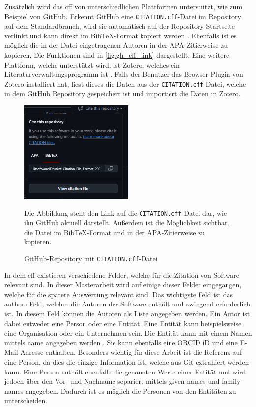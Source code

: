 Zusätzlich wird das \gls{cff} von unterschiedlichen Plattformen unterstützt, wie zum Beispiel von GitHub.
Erkennt GitHub eine \texttt{CITATION.cff}-Datei im Repository auf dem Standardbranch, wird sie automatisch auf der Repository-Startseite verlinkt und kann direkt im Bib\TeX{}-Format kopiert werden \autocite{druskat_citation_2021}.
Ebenfalls ist es möglich die in der Datei eingetragenen Autoren in der APA-Zitierweise zu kopieren.
Die Funktionen sind in \autoref{fig:gh_cff_link} dargestellt.
Eine weitere Plattform, welche unterstützt wird, ist Zotero, welches ein Literaturverwaltungsprogramm ist \autocite{druskat_citation_2021}.
Falls der Benutzer das Browser-Plugin von Zotero installiert hat, liest dieses die Daten aus der \texttt{CITATION.cff}-Datei, welche in dem GitHub Repository gespeichert ist und importiert die Daten in Zotero.

\begin{figure}
    \centering
    \includegraphics[width=0.5\textwidth]{bilder/GH_CFF_link.png}
    \caption{GitHub-Repository mit \texttt{CITATION.cff}-Datei}
    \label{fig:gh_cff_link}
    \small
    Die Abbildung stellt den Link auf die \texttt{CITATION.cff}-Datei dar, wie ihn GitHub aktuell darstellt.
    Außerdem ist die Möglichkeit sichtbar, die Datei im Bib\TeX{}-Format und in der APA-Zitierweise zu kopieren.
\end{figure}

In dem \gls{cff} existieren verschiedene Felder, welche für die Zitation von Software relevant sind.
In dieser Masterarbeit wird auf einige dieser Felder eingegangen, welche für die spätere Auswertung relevant sind.
Das wichtigste Feld ist das \glqq authors\grqq{}-Feld, welches die Autoren der Software enthält und zwingend erforderlich ist.
In diesem Feld können die Autoren als Liste angegeben werden.
Ein Autor ist dabei entweder eine Person oder eine Entität.
Eine Entität kann beispielsweise eine Organisation oder ein Unternehmen sein.
Die Entität kann mit einem Namen mittels \glqq name\grqq{} angegeben werden \autocite{druskat_citation_2021}.
Sie kann ebenfalls eine ORCID iD und eine E-Mail-Adresse enthalten.
Besonders wichtig für diese Arbeit ist die Referenz auf eine Person, da dies die einzige Information ist, welche aus Git extrahiert werden kann.
Eine Person enthält ebenfalls die genannten Werte einer Entität und wird jedoch über den Vor- und Nachname separiert mittels \glqq given-names\grqq{} und \glqq family-names\grqq{} angegeben.
Dadurch ist es möglich die Personen von den Entitäten zu unterscheiden.

